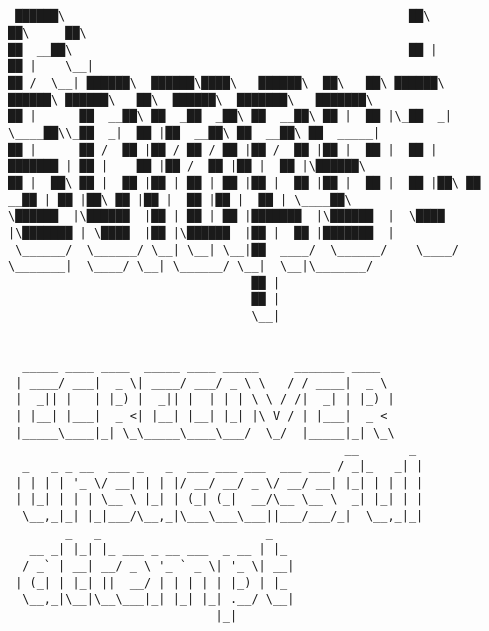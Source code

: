 \documentclass[varwidth=\maxdimen,margin=0.5cm,multi={verbatim}]{standalone}
\begin{document}
\begin{verbatim}


 ██████\                                                ██\                ██\     ██\
██  __██\                                               ██ |               ██ |    \__|
██ /  \__| ██████\  ██████\████\   ██████\  ██\   ██\ ██████\    ██████\ ██████\   ██\  ██████\  ███████\   ███████\
██ |      ██  __██\ ██  _██  _██\ ██  __██\ ██ |  ██ |\_██  _|   \____██\\_██  _|  ██ |██  __██\ ██  __██\ ██  _____|
██ |      ██ /  ██ |██ / ██ / ██ |██ /  ██ |██ |  ██ |  ██ |     ███████ | ██ |    ██ |██ /  ██ |██ |  ██ |\██████\
██ |  ██\ ██ |  ██ |██ | ██ | ██ |██ |  ██ |██ |  ██ |  ██ |██\ ██  __██ | ██ |██\ ██ |██ |  ██ |██ |  ██ | \____██\
\██████  |\██████  |██ | ██ | ██ |███████  |\██████  |  \████  |\███████ | \████  |██ |\██████  |██ |  ██ |███████  |
 \______/  \______/ \__| \__| \__|██  ____/  \______/    \____/  \_______|  \____/ \__| \______/ \__|  \__|\_______/
                                  ██ |
                                  ██ |
                                  \__|


  _____ ____ ____  _____ ____ _____     _______ ____
 | ____/ ___|  _ \| ____/ ___/ _ \ \   / / ____|  _ \
 |  _|| |   | |_) |  _|| |  | | | \ \ / /|  _| | |_) |
 | |__| |___|  _ <| |__| |__| |_| |\ V / | |___|  _ <
 |_____\____|_| \_\_____\____\___/  \_/  |_____|_| \_\
                                               __       _
  _   _ _ __  ___ _   _  ___ ___ ___  ___ ___ / _|_   _| |
 | | | | '_ \/ __| | | |/ __/ __/ _ \/ __/ __| |_| | | | |
 | |_| | | | \__ \ |_| | (_| (_|  __/\__ \__ \  _| |_| | |
  \__,_|_| |_|___/\__,_|\___\___\___||___/___/_|  \__,_|_|
        _   _                       _
   __ _| |_| |_ ___ _ __ ___  _ __ | |_
  / _` | __| __/ _ \ '_ ` _ \| '_ \| __|
 | (_| | |_| ||  __/ | | | | | |_) | |_
  \__,_|\__|\__\___|_| |_| |_| .__/ \__|
                             |_|




\end{verbatim}
\end{document}
